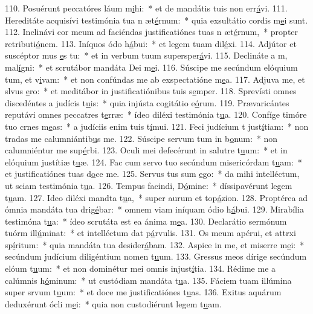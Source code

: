 110. Posuérunt peccatóres láum m\uline{i}hi:~* et de mandátis tuis non err\uline{á}vi.
111. Hereditáte acquisívi testimónia tua n æt\uline{é}rnum:~* quia exsultátio cordis m\uline{e}i sunt.
112. Inclinávi cor meum ad faciéndas justificatiónes tuas n æt\uline{é}rnum,~* propter retributi\uline{ó}nem.
113. Iníquos ódo h\uline{á}bui:~* et legem tuam dil\uline{é}xi.
114. Adjútor et suscéptor mus \uline{e}s tu:~* et in verbum tuum supersper\uline{á}vi.
115. Declináte a m, mal\uline{í}gni:~* et scrutábor mandáta Dei m\uline{e}i.
116. Súscipe me secúndum elóquium tum, et v\uline{i}vam:~* et non confúndas me ab exspectatióne m\uline{e}a.
117. Adjuva me, et slvus \uline{e}ro:~* et meditábor in justificatiónibus tuis s\uline{e}mper.
118. Sprevísti omnes discedéntes a judícis t\uline{u}is:~* quia injústa cogitátio e\uline{ó}rum.
119. Prævaricántes reputávi omnes peccatres t\uline{e}rræ:~* ídeo diléxi testimónia t\uline{u}a.
120. Confíge timóre tuo crnes m\uline{e}as:~* a judíciis enim tuis t\uline{í}mui.
121. Feci judícium t just\uline{í}tiam:~* non tradas me calumniántib\uline{u}s me.
122. Súscipe servum tum in b\uline{o}num:~* non calumniéntur me sup\uline{é}rbi.
123. Oculi mei defecérunt in salutre t\uline{u}um:~* et in elóquium justítiæ t\uline{u}æ.
124. Fac cum servo tuo secúndum misericórdam t\uline{u}am:~* et justificatiónes tuas d\uline{o}ce me.
125. Servus tus sum \uline{e}go:~* da mihi intelléctum, ut sciam testimónia t\uline{u}a.
126. Tempus facindi, D\uline{ó}mine:~* díssipavérunt legem t\uline{u}am.
127. Ideo diléxi mandta t\uline{u}a,~* super aurum et top\uline{á}zion.
128. Proptérea ad ómnia mandáta tua drig\uline{é}bar:~* omnem viam iníquam ódio h\uline{á}bui.
129. Mirabília testimóna t\uline{u}a:~* ídeo scrutáta est ea ánima m\uline{e}a.
130. Declarátio sermónum tuórm ill\uline{ú}minat:~* et intelléctum dat p\uline{á}rvulis.
131. Os meum apérui, et attrxi sp\uline{í}ritum:~* quia mandáta tua desider\uline{á}bam.
132. Aspice in me, et miserre m\uline{e}i:~* secúndum judícium diligéntium nomen t\uline{u}um.
133. Gressus meos dírige secúndum elóum t\uline{u}um:~* et non dominétur mei omnis injust\uline{í}tia.
134. Rédime me a calúmnis h\uline{ó}minum:~* ut custódiam mandáta t\uline{u}a.
135. Fáciem tuam illúmina super srvum t\uline{u}um:~* et doce me justificatiónes t\uline{u}as.
136. Exitus aquárum deduxérunt ócli m\uline{e}i:~* quia non custodiérunt legem t\uline{u}am.
